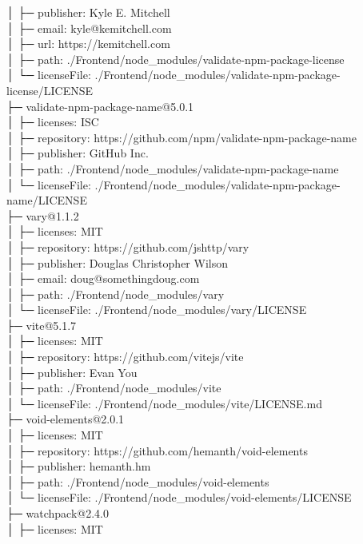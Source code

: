 │  ├─ publisher: Kyle E. Mitchell\\
│  ├─ email: kyle@kemitchell.com\\
│  ├─ url: https://kemitchell.com\\
│  ├─ path: ./Frontend/node\_modules/validate-npm-package-license\\
│  └─ licenseFile: ./Frontend/node\_modules/validate-npm-package-license/LICENSE\\
├─ validate-npm-package-name@5.0.1\\
│  ├─ licenses: ISC\\
│  ├─ repository: https://github.com/npm/validate-npm-package-name\\
│  ├─ publisher: GitHub Inc.\\
│  ├─ path: ./Frontend/node\_modules/validate-npm-package-name\\
│  └─ licenseFile: ./Frontend/node\_modules/validate-npm-package-name/LICENSE\\
├─ vary@1.1.2\\
│  ├─ licenses: MIT\\
│  ├─ repository: https://github.com/jshttp/vary\\
│  ├─ publisher: Douglas Christopher Wilson\\
│  ├─ email: doug@somethingdoug.com\\
│  ├─ path: ./Frontend/node\_modules/vary\\
│  └─ licenseFile: ./Frontend/node\_modules/vary/LICENSE\\
├─ vite@5.1.7\\
│  ├─ licenses: MIT\\
│  ├─ repository: https://github.com/vitejs/vite\\
│  ├─ publisher: Evan You\\
│  ├─ path: ./Frontend/node\_modules/vite\\
│  └─ licenseFile: ./Frontend/node\_modules/vite/LICENSE.md\\
├─ void-elements@2.0.1\\
│  ├─ licenses: MIT\\
│  ├─ repository: https://github.com/hemanth/void-elements\\
│  ├─ publisher: hemanth.hm\\
│  ├─ path: ./Frontend/node\_modules/void-elements\\
│  └─ licenseFile: ./Frontend/node\_modules/void-elements/LICENSE\\
├─ watchpack@2.4.0\\
│  ├─ licenses: MIT\\
